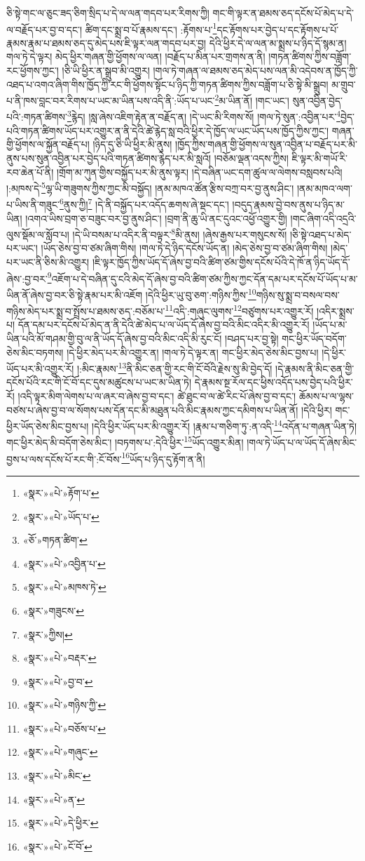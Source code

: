 ཅི་སྟེ་གང་ལ་ཅུང་ཟད་ཅིག་སྲིད་པ་དེ་ལ་ལན་གདབ་པར་རིགས་ཀྱི། གང་གི་ལྟར་ན་ཐམས་ཅད་དངོས་པོ་མེད་པ་དེ་ལ་བརྗོད་པར་བྱ་བ་དང་། ཚིག་དང་སྨྲ་བ་པོ་རྣམས་དང་། :རྟོགས་པ་\footnote{«སྣར་»«པེ་»རྟོག་པ་}དང་རྟོགས་པར་བྱེད་པ་དང་རྟོགས་པ་པོ་རྣམས་རྣམ་པ་ཐམས་ཅད་དུ་མེད་པས་ཇི་ལྟར་ལན་གདབ་པར་བྱ། དེའི་ཕྱིར་དེ་ལ་ལན་མ་སྨྲས་པ་ཉིད་དོ་སྙམ་ན། གལ་ཏེ་དེ་ལྟར། མེད་ཕྱིར་གཞན་གྱི་ཕྱོགས་ལ་ལན། །བརྗོད་པ་མིན་པར་གྲགས་ན་ནི། །གཏན་ཚིགས་ཀྱིས་བཟློག་རང་ཕྱོགས་ཀྱང་། །ཅི་ཡི་ཕྱིར་ན་སྒྲུབ་མི་འགྱུར། །གལ་ཏེ་གཞན་ལ་ཐམས་ཅད་མེད་པས་ལན་མི་འདེབས་ན་ཁྱོད་ཀྱི་འཐད་པ་འགའ་ཞིག་གིས་ཁྱོད་ཀྱི་རང་གི་ཕྱོགས་སྟོང་པ་ཉིད་ཀྱི་གཏན་ཚིགས་ཀྱིས་བཟློག་པ་ཅི་སྟེ་མི་སྒྲུབ། མ་གྲུབ་པ་ནི་ཁས་བླང་བར་རིགས་པ་ཡང་མ་ཡིན་པས་འདི་ནི་:ཡོད་པ་ཡང་\footnote{«སྣར་»«པེ་»ཡོད་པ་}མ་ཡིན་ནོ། །གང་ཡང་། སུན་འབྱིན་བྱེད་པའི་:གཏན་ཚིགས་\footnote{«ཅོ་»གཏན་ཚིག་}རྙེད། །སླ་ཞེས་འཇིག་རྟེན་ན་བརྗོད་ན། །དེ་ཡང་མི་རིགས་སོ། །གལ་ཏེ་སུན་:འབྱིན་པར་\footnote{«སྣར་»«པེ་»འབྱིན་པ་}བྱེད་པའི་གཏན་ཚིགས་ཡོད་པར་འགྱུར་ན་ནི་དེའི་ཚེ་རྙེད་སླ་བའི་ཕྱིར་དེ་ཁྱོད་ལ་ཡང་ཡོད་པས་ཁྱོད་ཀྱིས་ཀྱང་། གཞན་གྱི་ཕྱོགས་ལ་སྐྱོན་བརྗོད་པ། །ཉིད་དུ་ཅི་ཡི་ཕྱིར་མི་ནུས། །ཁྱོད་ཀྱིས་གཞན་གྱི་ཕྱོགས་ལ་སུན་འབྱིན་པ་བརྗོད་པར་མི་ནུས་པས་སུན་འབྱིན་པར་བྱེད་པའི་གཏན་ཚིགས་རྙེད་པར་མི་སླའོ། །བཅོམ་ལྡན་འདས་ཀྱིས། ཇི་ལྟར་མི་གཡོ་རི་རབ་ཆེན་པོ་ནི། །གྲོག་མ་ཀུན་གྱིས་བསྐྱོད་པར་མི་ནུས་ལྟར། །དེ་བཞིན་ཡང་དག་ཚུལ་ལ་ལེགས་བསླབས་པའི། །:མཁས་དེ་\footnote{«སྣར་»«པེ་»མཁས་ཏེ་}ལྷ་ཡི་གཟུགས་ཀྱིས་ཀྱང་མི་བསྐྱོད། །ནམ་མཁའ་ཚོན་རྩིས་བཀྲ་བར་བྱ་ནུས་ཤིང་། །ནམ་མཁའ་ལག་པ་ཡིས་ནི་གཟུང་\footnote{«སྣར་»གཟུངས་}ནུས་ཀྱི།\footnote{«སྣར་»ཀྱིས།} །དེ་ནི་བསྐྱོད་པར་འདོད་ཆགས་ཞེ་སྡང་དང་། །བདུད་རྣམས་བྱེ་བས་ནུས་པ་ཉིད་མ་ཡིན། །འགའ་ཡིས་བྲག་ཅ་བཟུང་བར་བྱ་ནུས་ཤིང་། །བྲག་ནི་ཆུ་ཡི་ནང་དུའང་འཕྱོ་འགྱུར་གྱི། །གང་ཞིག་འདི་འདྲའི་ལུས་སྡོམ་ལ་སློབ་པ། །དེ་ཡི་བསམ་པ་འདིར་ནི་བལྟར་\footnote{«སྣར་»«པེ་»བརྡར་}མི་ནུས། །ཞེས་རྒྱས་པར་གསུངས་སོ། །ཅི་སྟེ་འཐད་པ་མེད་པར་ཡང་། །ཡོད་ཅེས་བྱ་བ་ཙམ་ཞིག་གིས། །གལ་ཏེ་དེ་ཉིད་དངོས་ཡོད་ན། །མེད་ཅེས་བྱ་བ་ཙམ་ཞིག་གིས། །མེད་པར་ཡང་ནི་ཅིས་མི་འགྱུར། །ཇི་ལྟར་ཁྱོད་ཀྱིས་ཡོད་དོ་ཞེས་བྱ་བའི་ཚིག་ཙམ་གྱིས་དངོས་པོའི་དེ་ཁོ་ན་ཉིད་ཡོད་དོ་ཞེས་:བྱ་བར་\footnote{«སྣར་»«པེ་»བྱ་བ་}འཇོག་པ་དེ་བཞིན་དུ་ངའི་མེད་དོ་ཞེས་བྱ་བའི་ཚིག་ཙམ་ཀྱིས་ཀྱང་དོན་དམ་པར་དངོས་པོ་ཡོད་པ་མ་ཡིན་ནོ་ཞེས་བྱ་བར་ཅི་སྟེ་རྣམ་པར་མི་འཇོག །དེའི་ཕྱིར་ཡུ་བུ་ཅག་:གཉིས་ཀྱིས་\footnote{«སྣར་»«པེ་»གཉིས་ཀྱི་}གཉིས་སུ་སྨྲ་བ་བསལ་བས་གཉིས་མེད་པར་སྨྲ་བ་སྤྲོས་པ་ཐམས་ཅད་:བཅོམ་པ་\footnote{«སྣར་»«པེ་»བཅོས་པ་}འདི་:གཞུང་ལུགས་\footnote{«སྣར་»«པེ་»གཞུང་}བཙུགས་པར་འགྱུར་རོ། །འདིར་སྨྲས་པ། དོན་དམ་པར་དངོས་པོ་མེད་ན་ནི་དེའི་ཚེ་མེད་པ་ལ་ཡོད་དོ་ཞེས་བྱ་བའི་མིང་འདིར་མི་འགྱུར་རོ། །ཡོད་པ་མ་ཡིན་པའི་མོ་གཤམ་གྱི་བུ་ལ་ནི་ཡོད་དོ་ཞེས་བྱ་བའི་མིང་འདི་མི་རུང་ངོ། །བཤད་པར་བྱ་སྟེ། གང་ཕྱིར་ཡོད་བདོག་ཅེས་མིང་བཏགས། །དེ་ཕྱིར་མེད་པར་མི་འགྱུར་ན། །གལ་ཏེ་དེ་ལྟར་ན། གང་ཕྱིར་མེད་ཅེས་མིང་བྱས་པ། །དེ་ཕྱིར་ཡོད་པར་མི་འགྱུར་རོ། །:མིང་རྣམས་\footnote{«སྣར་»«པེ་»མིང་}ནི་མིང་ཅན་གྱི་རང་གི་ངོ་བོའི་རྗེས་སུ་མི་བྱེད་དོ། །དེ་རྣམས་ནི་མིང་ཅན་གྱི་དངོས་པོའི་རང་གི་ངོ་བོ་དང་དུས་མཚུངས་པ་ཡང་མ་ཡིན་ཏེ། དེ་རྣམས་སྔ་རོལ་དང་ཕྱིས་འདོད་པས་བྱེད་པའི་ཕྱིར་རོ། །འདི་ལྟར་མིག་ལེགས་པ་ལ་ཞར་བ་ཞེས་བྱ་བ་དང་། ཚེ་ཐུང་བ་ལ་ཚེ་རིང་པོ་ཞེས་བྱ་བ་དང་། ཆོམས་པ་ལ་ལྷས་བཙས་པ་ཞེས་བྱ་བ་ལ་སོགས་པས་དོན་དང་མི་མཐུན་པའི་མིང་རྣམས་ཀྱང་དམིགས་པ་ཡིན་ནོ། །དེའི་ཕྱིར། གང་ཕྱིར་ཡོད་ཅེས་མིང་བྱས་པ། །དེའི་ཕྱིར་ཡོད་པར་མི་འགྱུར་རོ། །རྣམ་པ་གཅིག་ཏུ་:ན་འདི་\footnote{«སྣར་»«པེ་»ན་}འདོན་པ་གཞན་ཡིན་ཏེ། གང་ཕྱིར་མེད་མི་བདོག་ཅེས་མིང་། །བཏགས་པ་:དེའི་ཕྱིར་\footnote{«སྣར་»«པེ་»དེ་ཕྱིར་}ཡོད་འགྱུར་མིན། །གལ་ཏེ་ཡོད་པ་ལ་ཡོད་དོ་ཞེས་མིང་བྱས་པ་ལས་དངོས་པོ་རང་གི་:ངོ་བོས་\footnote{«སྣར་»«པེ་»ངོ་བོ་}ཡོད་པ་ཉིད་དུ་རྟོག་ན་ནི། 